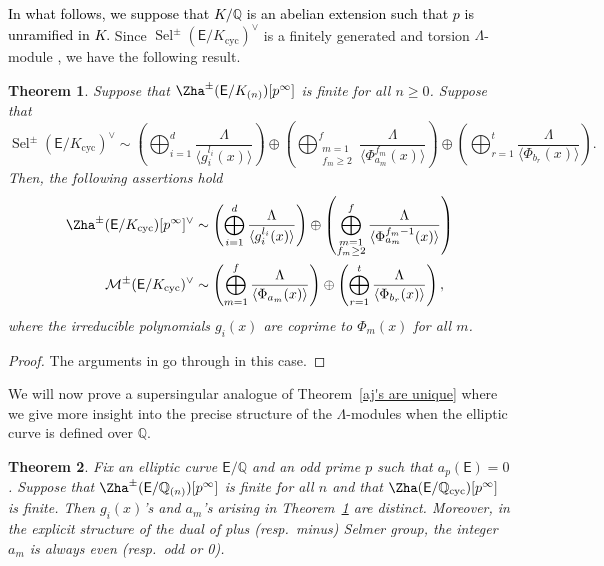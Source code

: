 \documentclass{amsart}
\newcommand{\edit}[1]{\textcolor{black}{#1}}
\newtheorem{theorem}{Theorem}[section]
\numberwithin{equation}{section}
\theoremstyle{remark}
\newcommand{\EC}{\mathsf{E}}
\newcommand{\cM}{\mathcal{M}}
\newcommand{\Q}{\mathbb{Q}}
\newcommand{\cyc}{\operatorname{{cyc}}}
\newcommand{\Sel}{\operatorname{Sel}}
\theoremstyle{plain} %
\begin{document}
\edit{In what follows, we suppose that $K/\Q$ is an abelian extension such that $p$ is unramified in $K$.}
Since $\Sel^{\pm}(\EC/K_{\cyc})^\vee$ is a finitely generated and torsion $\Lambda$-module \edit{\cite[Proposition~2.3 and Equation~(5.7)]{Kat21}}, we have the following result.

\begin{theorem}
\label{our analogue of Lee 3.0.6}
Suppose that $\Zha^{\pm}(\EC/K_{(n)})[p^\infty]$ is finite for all $n\geq 0$.
Suppose that
\[
\Sel^{\pm}(\EC/K_{\cyc})^\vee \sim \left( \bigoplus_{i=1}^d \frac{\Lambda}{\langle g^{l_i}_i(x) \rangle}\right) \oplus \left( \bigoplus_{\substack{m=1 \\ f_m\geq 2}}^f \frac{\Lambda}{\langle \Phi^{f_m}_{a_m}(x)\rangle}\right) \oplus \left( \bigoplus_{r=1}^t \frac{\Lambda}{\langle \Phi_{b_r}(x)\rangle}\right).
\]
Then, the following assertions hold
\begin{align*}
\Zha^{\pm}(\EC/K_{\cyc})[p^\infty]^\vee & \sim \left( \bigoplus_{i=1}^d \frac{\Lambda}{\langle g^{l_i}_i(x) \rangle}\right) \oplus \left( \bigoplus_{\substack{m=1 \\ f_m\geq 2}}^f \frac{\Lambda}{\langle \Phi^{f_m - 1}_{a_m}(x)\rangle}\right)\\
\cM^{\pm}(\EC/K_{\cyc})^\vee & \sim \left( \bigoplus_{m=1}^f \frac{\Lambda}{\langle \Phi_{a_m}(x)\rangle}\right) \oplus \left( \bigoplus_{r=1}^t \frac{\Lambda}{\langle \Phi_{b_r}(x)\rangle}\right),
\end{align*}
where the irreducible polynomials $g_i(x)$ are coprime to $\Phi_m(x)$ for all $m$.
\end{theorem}

\begin{proof}
The arguments in \cite[Corollary~3.0.6]{Lee20} go through in this case.
\end{proof}

We will now prove a supersingular analogue of Theorem~\ref{aj's are unique} where we give more insight into the precise structure of the $\Lambda$-modules when the elliptic curve is defined over $\Q$.

\begin{theorem}
\label{Thm 3 in note from June 16}
Fix an elliptic curve $\EC/\Q$ and an odd prime $p$ such that $a_p(\EC) =0$.
Suppose that $\Zha^{\pm}(\EC/\Q_{(n)})[p^{\infty}]$ is finite for all $n$ and that $\Zha(\EC/\Q_{\cyc})[p^\infty]$ is finite.
Then $g_i(x)$'s and $a_m$'s arising in Theorem~\ref{our analogue of Lee 3.0.6} are distinct.
Moreover, in the explicit structure of the dual of plus (resp.~minus) Selmer group, the integer $a_m$ is always even (resp.~odd or 0).
\end{theorem}
\end{document}
